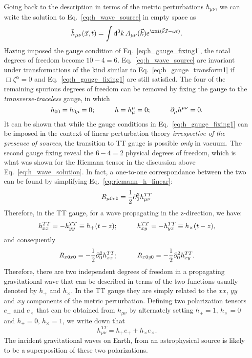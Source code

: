 Going back to the description in terms of the metric perturbations 
$\hbar_{\mu\nu}$, we can write the solution to Eq.~\ref{eq:h_wave_source}
in empty space as
\begin{equation}\label{eq:h_wave_solution}
 \hbarr_{\mu\nu}(\vec{x},t) = \int \D^3 k\, A_{\mu\nu}(\vec{k}) e^{\ii (\vec{k}\dotfill \vec{x} - \omega t)}.
\end{equation}
Having imposed the gauge condition of Eq.~\ref{eq:h_gauge_fixing1}, the total 
degrees of freedom become $10 - 4 = 6$. Eq.~\ref{eq:h_wave_source} are invariant
under transformations of the kind similar to Eq.~\ref{eq:h_gauge_transform1}
if $\Box\zeta^\alpha = 0$ and Eq.~\ref{eq:h_gauge_fixing1} are still satisfied.
The four of the remaining spurious degrees of freedom can be removed by fixing
the gauge to the {\it transverse-traceless} gauge, in which
\begin{equation}\label{eq:h_gauge_fixing2}
 h_{00} = h_{0\mu} = 0;\hspace{10mm} h = h^\mu_\mu = 0;\hspace{10mm} \pd_\mu h^{\mu\nu} = 0.
\end{equation}
It can be shown that while the gauge conditions in Eq.~\ref{eq:h_gauge_fixing1}
can be imposed in the context of linear perturbation theory {\it irrespective of
the presence of sources}, the transition to TT gauge is possible {\it only} in 
vacuum. 
%
The second gauge fixing reveal the $6 - 4 = 2$ physical degrees of freedom, which
is what was shown for the Riemann tensor in the discussion above 
Eq.~\ref{eq:h_wave_solution}. 
In fact, a one-to-one correspondance between the two can be found by simplifying 
Eq.~\ref{eq:riemann_h_linear}:
%
\begin{equation}
 R_{\mu 0\nu 0} = \frac{1}{2}\partial_0^2 h^{TT}_{\mu\nu}
\end{equation}
%
Therefore, in the TT gauge, for a wave propagating in the z-direction, we have:
\begin{equation}
 h_{xx}^{TT} = -h_{yy}^{TT} \equiv h_+(t-z);\hspace{10mm} h_{xy}^{TT} = -h_{yx}^{TT} \equiv h_\times(t-z),
\end{equation}
and consequently
\begin{equation}
 R_{x0x0} = -\frac{1}{2}\pd_0^2 h_{xx}^{TT};\hspace{10mm} R_{x0y0} = -\frac{1}{2}\pd_0^2 h_{xy}^{TT}.
\end{equation}
Therefore, there are two independent degrees of freedom in a propagating 
gravitational wave that can be described in terms of the two functions 
usually denoted by $h_+$ and $h_\times$. In the TT gauge they are simply
related to the $xx$, $yy$ and $xy$ components of the metric perturbation.
Defining two polarization tensors $e_+$ and $e_\times$ that can be obtained
from $h_{\mu\nu}$ by alternately setting $h_+=1,\,h_\times=0$ and 
$h_+=0,\,h_\times=1$, we write down that 
\begin{equation}
 h_{\mu\nu}^{TT} = h_+ e_+ + h_\times e_\times.
\end{equation}
The incident gravitational waves on Earth, from an astrophysical source 
is likely to be a superposition of these two polarizations. 



